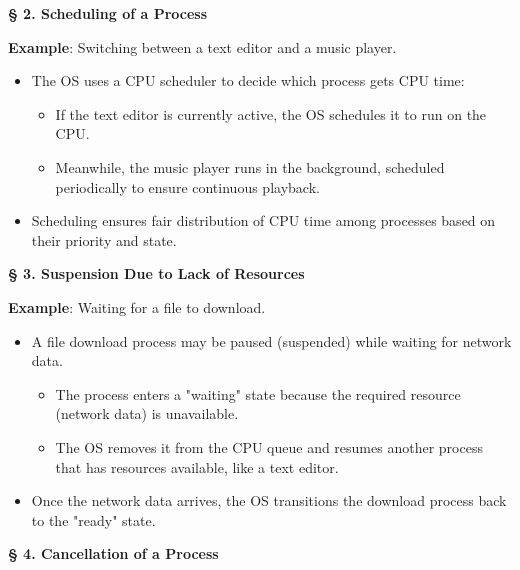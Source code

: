 \documentclass[a4paper]{book}
\newcommand{\sfbf}[1]{{\normalsize\textsf{\textbf{§ #1}}}}
\begin{document}
\hrulefill

\sfbf{2. Scheduling of a Process}

\textbf{Example}: Switching between a text editor and a music player.
\begin{itemize}
\item 
The OS uses a CPU scheduler to decide which process gets CPU time:
\begin{itemize}
\item 
If the text editor is currently active, the OS schedules it to run on the CPU.

\item 
Meanwhile, the music player runs in the background, scheduled periodically to ensure continuous playback.

\end{itemize}

\item 
Scheduling ensures fair distribution of CPU time among processes based on their priority and state.

\end{itemize}

\hrulefill

\sfbf{3. Suspension Due to Lack of Resources}

\textbf{Example}: Waiting for a file to download.
\begin{itemize}
\item 
A file download process may be paused (suspended) while waiting for network data.
\begin{itemize}
\item 
The process enters a "waiting" state because the required resource (network data) is unavailable.

\item 
The OS removes it from the CPU queue and resumes another process that has resources available, like a text editor.

\end{itemize}

\item 
Once the network data arrives, the OS transitions the download process back to the "ready" state.

\end{itemize}

\hrulefill

\sfbf{4. Cancellation of a Process}
\end{document}
